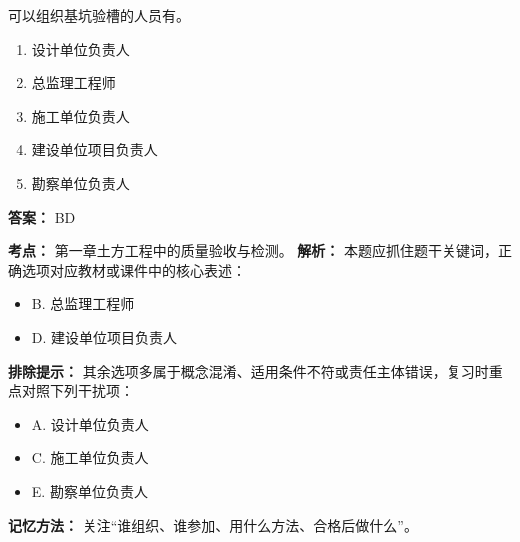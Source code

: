 \documentclass[UTF8,fontset=fandol,11pt]{ctexart}
\begin{document}
\begin{quizbox}[title={第 24 题}]
可以组织基坑验槽的人员有。\\
\begin{enumerate}[label=\Alph*.]
\item 设计单位负责人
\item 总监理工程师
\item 施工单位负责人
\item 建设单位项目负责人
\item 勘察单位负责人
\end{enumerate}
\textbf{答案：} BD
\vspace{0.25em}
\begin{answerbox}[title={考点解析}]
\textbf{考点：} 第一章土方工程中的质量验收与检测。
\textbf{解析：} 本题应抓住题干关键词，正确选项对应教材或课件中的核心表述：
\begin{itemize}
\item B. 总监理工程师
\item D. 建设单位项目负责人
\end{itemize}
\textbf{排除提示：} 其余选项多属于概念混淆、适用条件不符或责任主体错误，复习时重点对照下列干扰项：
\begin{itemize}
\item A. 设计单位负责人
\item C. 施工单位负责人
\item E. 勘察单位负责人
\end{itemize}
\textbf{记忆方法：} 关注“谁组织、谁参加、用什么方法、合格后做什么”。
\end{answerbox}
\end{quizbox}

\vspace{0.2em}
\end{document}
